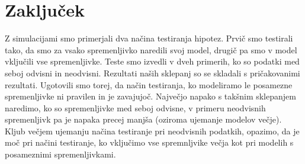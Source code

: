 \documentclass[letterpaper,11pt]{article}
\begin{document}
\section{Zaključek}
Z simulacijami smo primerjali dva načina testiranja hipotez. Prvič smo testirali tako, da smo za vsako spremenljivko naredili svoj model, drugič pa smo v model vključili vse spremenljivke. Teste smo izvedli v dveh primerih, ko so podatki med seboj odvisni in neodvisni. Rezultati naših sklepanj so se skladali s pričakovanimi rezultati. Ugotovili smo torej, da način testiranja, ko modeliramo le posamezne spremenljivke ni pravilen in je zavajujoč. Največjo napako s takšnim sklepanjem naredimo, ko so spremenljivke med seboj odvisne, v primeru neodvisnih spremenljivk pa je napaka precej manjša (oziroma ujemanje modelov večje). Kljub večjem ujemanju načina testiranje pri neodvisnih podatkih, opazimo, da je moč pri načini testiranje, ko vključimo vse spremnljvike večja kot pri modelih s posameznimi spremenljivkami. 
\end{document}

